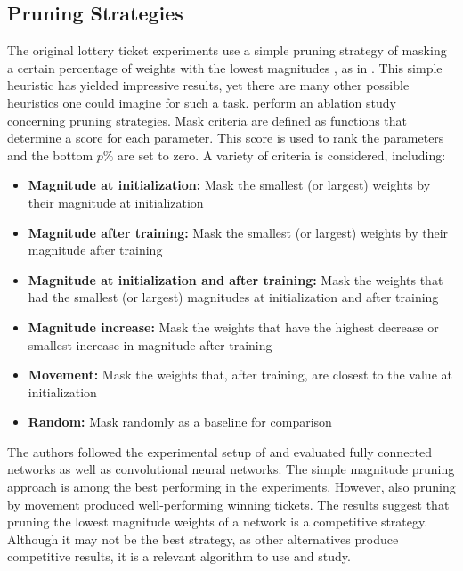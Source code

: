 \subsection{Pruning Strategies}
The original lottery ticket experiments use a simple pruning strategy of masking a certain percentage of weights with the lowest magnitudes \autocite{LTH}, as in \autocite{HanEtAl15}. This simple heuristic has yielded impressive results, yet there are many other possible heuristics one could imagine for such a task.
\textcite{Supermasks} perform an ablation study concerning pruning strategies. Mask criteria are defined as functions that determine a score for each parameter. This score is used to rank the parameters and the bottom $p\%$ are set to zero.
A variety of criteria is considered, including: 
\begin{itemize}
\item \textbf{Magnitude at initialization:} Mask the smallest (or largest) weights by their magnitude at initialization
\item \textbf{Magnitude after training:} Mask the smallest (or largest) weights by their magnitude after training
\item \textbf{Magnitude at initialization and after training:} Mask the weights that had the smallest (or largest) magnitudes at initialization and after training
\item \textbf{Magnitude increase:} Mask the weights that have the highest decrease or smallest increase in magnitude after training
\item \textbf{Movement:} Mask the weights that, after training, are closest to the value at initialization
\item \textbf{Random:} Mask randomly as a baseline for comparison
\end{itemize}
The authors followed the experimental setup of \textcite{LTH} and evaluated fully connected networks as well as convolutional neural networks.
The simple magnitude pruning approach is among the best performing in the experiments.
However, also pruning by movement produced well-performing winning tickets.
The results suggest that pruning the lowest magnitude weights of a network is a competitive strategy.
Although it may not be the best strategy, as other alternatives produce competitive results, it is a relevant algorithm to use and study. 

